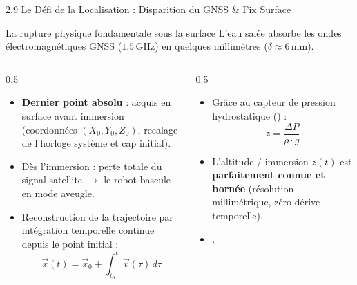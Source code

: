 \begin{frame}{2.9 Le Défi de la Localisation : Disparition du GNSS \& Fix Surface}
  \begin{alertblock}{La rupture physique fondamentale sous la surface}
    L'eau salée absorbe les ondes électromagnétiques GNSS ($1.5\,\text{GHz}$) en quelques millimètres ($\delta \approx 6\,\text{mm}$).
  \end{alertblock}
  \vspace{-2.5mm}
  \begin{columns}[T]
    \begin{column}{0.5\textwidth}
      \begin{block}{}
        \scriptsize
        \begin{itemize}
          \item \textbf{Dernier point absolu} : acquis en surface avant immersion (coordonnées $(X_0, Y_0, Z_0)$, recalage de l'horloge système et cap initial).
          \item Dès l'immersion : perte totale du signal satellite $\rightarrow$ le robot bascule en mode aveugle.
        \end{itemize}
      \end{block}

      \begin{block}{}
        \scriptsize
        \begin{itemize}
          \item Reconstruction de la trajectoire par intégration temporelle continue depuis le point initial :
          \[
            \vec{x}(t) = \vec{x}_0 + \int_{t_0}^t \vec{v}(\tau) \, d\tau
          \]
        \end{itemize}
      \end{block}
    \end{column}

    \begin{column}{0.5\textwidth}
      \begin{block}{}
        \scriptsize
        \begin{itemize}
          \item Grâce au capteur de pression hydrostatique () :
          \[
            z = \frac{\Delta P}{\rho \cdot g}
          \]
          \item L'altitude / immersion $z(t)$ est \textbf{parfaitement connue et bornée} (résolution millimétrique, zéro dérive temporelle).
          \item {}.
        \end{itemize}
      \end{block}
    \end{column}
  \end{columns}
\end{frame}


